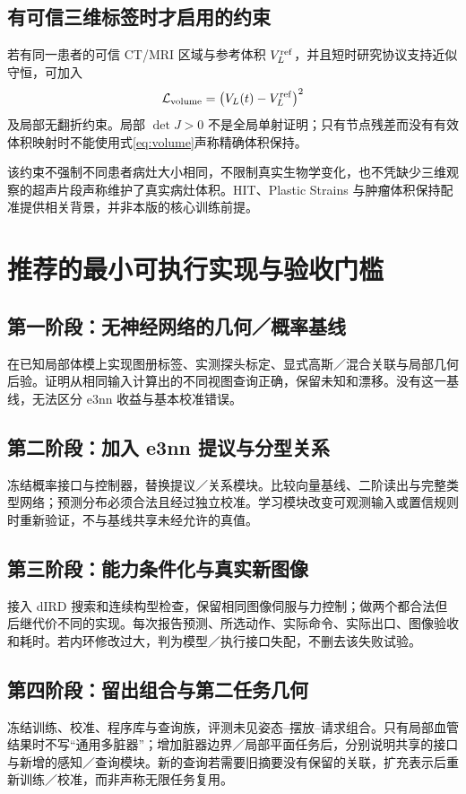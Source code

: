\documentclass[UTF8,fontset=fandol,11pt,a4paper]{ctexart}
\theoremstyle{plain}
\theoremstyle{definition}
\theoremstyle{remark}
\numberwithin{equation}{section}
\begin{document}
\subsection{有可信三维标签时才启用的约束}
若有同一患者的可信 CT/MRI 区域与参考体积 $V_L^{\rm ref}$，并且短时研究协议支持近似守恒，可加入
\begin{equation}
 \mathcal L_{\rm volume}=\left(V_L(t)-V_L^{\rm ref}\right)^2
\end{equation}
及局部无翻折约束。局部 $\det J>0$ 不是全局单射证明；只有节点残差而没有有效体积映射时不能使用式\eqref{eq:volume}声称精确体积保持。

该约束不强制不同患者病灶大小相同，不限制真实生物学变化，也不凭缺少三维观察的超声片段声称维护了真实病灶体积。HIT、Plastic Strains 与肿瘤体积保持配准提供相关背景\cite{hit,plastic,tumor}，并非本版的核心训练前提。

\section{推荐的最小可执行实现与验收门槛}
\label{app:minimal}
\subsection{第一阶段：无神经网络的几何／概率基线}
在已知局部体模上实现图册标签、实测探头标定、显式高斯／混合关联与局部几何后验。证明从相同输入计算出的不同视图查询正确，保留未知和漂移。没有这一基线，无法区分 e3nn 收益与基本校准错误。

\subsection{第二阶段：加入 e3nn 提议与分型关系}
冻结概率接口与控制器，替换提议／关系模块。比较向量基线、二阶读出与完整类型网络；预测分布必须合法且经过独立校准。学习模块改变可观测输入或置信规则时重新验证，不与基线共享未经允许的真值。

\subsection{第三阶段：能力条件化与真实新图像}
接入 dIRD 搜索和连续构型检查，保留相同图像伺服与力控制；做两个都合法但后继代价不同的实现。每次报告预测、所选动作、实际命令、实际出口、图像验收和耗时。若内环修改过大，判为模型／执行接口失配，不删去该失败试验。

\subsection{第四阶段：留出组合与第二任务几何}
冻结训练、校准、程序库与查询族，评测未见姿态--摆放--请求组合。只有局部血管结果时不写“通用多脏器”；增加脏器边界／局部平面任务后，分别说明共享的接口与新增的感知／查询模块。新的查询若需要旧摘要没有保留的关联，扩充表示后重新训练／校准，而非声称无限任务复用。
\end{document}
